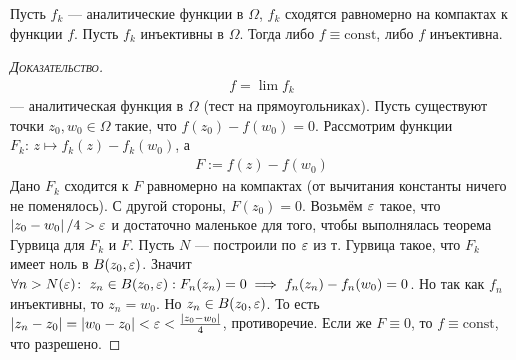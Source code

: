 \documentclass[../complex-analysis.tex]{subfiles}
\begin{document}
 \begin{thm}
  \label{theorem:analytic_injective}
  Пусть $ f_k $ --- аналитические функции в $ \Omega $, $ f_k $ сходятся равномерно на компактах к функции $ f $. Пусть $ f_k $ инъективны в $ \Omega $. Тогда либо $ f \equiv \mathrm{const} $, либо $ f $ инъективна.
 \end{thm}
 \begin{proof}[\normalfont\textsc{Доказательство}]
  \begin{align*}
   f = \lim f_k
  \end{align*} --- аналитическая функция в $ \Omega $ (тест на прямоугольниках). Пусть существуют точки $ z_0,w_0 \in \Omega $ такие, что $ f(z_0) - f(w_0) = 0 $. Рассмотрим функции $ F_k \colon\, z \mapsto f_k(z) - f_k(w_0) $, а
  \begin{align*}
   F := f(z) - f(w_0)
  \end{align*} Дано $F_k$ сходится к $ F $ равномерно на компактах (от вычитания константы ничего не поменялось). С другой стороны, $ F(z_0) = 0 $.
  Возьмём $ \varepsilon $ такое, что $ \left| z_0 - w_0 \right| / 4 > \varepsilon $ и достаточно маленькое для того, чтобы выполнялась теорема Гурвица для $ F_k $ и $ F $.
  Пусть $ N $ --- построили по $ \varepsilon $ из т. Гурвица такое, что $ F_k $ имеет ноль в $ B(z_0, \varepsilon) $.
  Значит $ \forall n > N(\varepsilon) \colon\; z_n \in B(z_0,\varepsilon): F_n(z_n) = 0 \implies f_n(z_n) - f_n(w_0) = 0 $.
  Но так как $ f_n $ инъективны, то $ z_n = w_0 $. Но $ z_n \in B(z_0, \varepsilon) $.
  То есть $ \left|z_n - z_0 \right| = \left|w_0 - z_0 \right| < \varepsilon < \frac{\left| z_0-w_0 \right|}{4} $, противоречие.
  Если же $ F \equiv 0 $, то $ f \equiv \mathrm{const} $, что разрешено.
 \end{proof}
 
\end{document}
